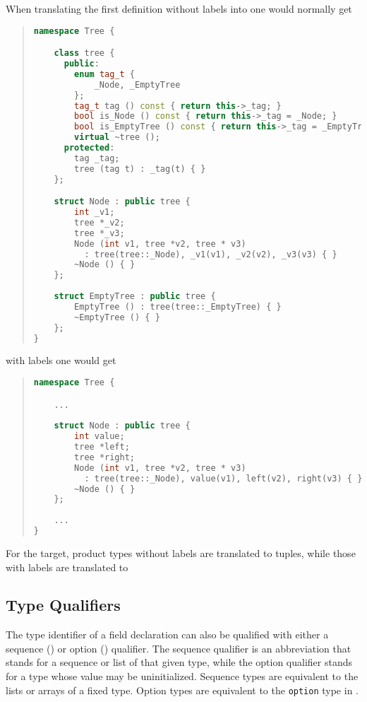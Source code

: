 When translating the first definition without labels 
into \Cplusplus{} one would normally get
\begin{quote}\begin{lstlisting}[language=c++]
namespace Tree {

    class tree {
      public:
        enum tag_t {
            _Node, _EmptyTree
        };
        tag_t tag () const { return this->_tag; }
        bool is_Node () const { return this->_tag = _Node; }
        bool is_EmptyTree () const { return this->_tag = _EmptyTree; }
        virtual ~tree ();
      protected:
        tag _tag;
        tree (tag t) : _tag(t) { }
    };

    struct Node : public tree {
        int _v1;
        tree *_v2;
        tree *_v3;
        Node (int v1, tree *v2, tree * v3)
          : tree(tree::_Node), _v1(v1), _v2(v2), _v3(v3) { }
        ~Node () { }
    };
    
    struct EmptyTree : public tree {
        EmptyTree () : tree(tree::_EmptyTree) { }
        ~EmptyTree () { }
    };
}
\end{lstlisting}\end{quote}%
with labels one would get
\begin{quote}\begin{lstlisting}[language=c++]
namespace Tree {

    ...
    
    struct Node : public tree {
        int value;
        tree *left;
        tree *right;
        Node (int v1, tree *v2, tree * v3)
          : tree(tree::_Node), value(v1), left(v2), right(v3) { }
        ~Node () { }
    };
    
    ...
}
\end{lstlisting}\end{quote}%

For the \sml{} target, product types without labels are translated to tuples, while those with
labels are translated to 
\subsection{Type Qualifiers}

The type identifier of a field declaration can also be qualified with either
a sequence (\lit{*}) or option () qualifier.
The sequence qualifier
is an abbreviation that stands for a sequence or list of that given type,
while the option qualifier stands for a type whose value may be
uninitialized.
Sequence types are equivalent to the lists or arrays of a
fixed type.
Option types are equivalent to the \lstinline[language=ASDL]!option!
type in \sml{}.

